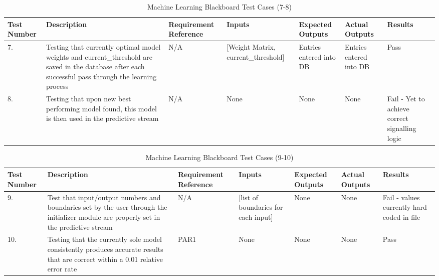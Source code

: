 \documentclass[12pt, titlepage]{article}
\begin{document}
\begin{center}
    \begin{table}[H]
        \centering
        \begin{tabular}{|p{1cm}|p{2.2cm}|p{2.5cm}|p{2.7cm}|p{2.4cm}|p{2.4cm}|p{1.3cm}|}
        \hline
        \bf Test Number & \bf Description & \bf Requirement Reference & \bf Inputs & \bf Expected Outputs & \bf Actual Outputs & \bf Results \\
        \hline
        7. & Testing that currently optimal model weights and current\_threshold are saved in the database after each successful pass through the learning process & N/A & [Weight Matrix, current\_threshold] & Entries entered into DB & Entries entered into DB & Pass\\
        \hline
        8. & Testing that upon new best performing model found, this model is then used in the predictive stream & N/A & None & None & None & Fail - Yet to achieve correct signalling logic\\
        \hline
        \end{tabular}
        \caption{Machine Learning Blackboard Test Cases (7-8)}
        \label{tab:my_label18}
    \end{table}
\end{center}


\begin{center}
    \begin{table}[H]
        \centering
        \begin{tabular}{|p{1cm}|p{2.2cm}|p{2.5cm}|p{2.7cm}|p{2.4cm}|p{2.4cm}|p{1.3cm}|}
        \hline
        \bf Test Number & \bf Description & \bf Requirement Reference & \bf Inputs & \bf Expected Outputs & \bf Actual Outputs & \bf Results \\
        \hline
        9. & Test that input/output numbers and boundaries set by the user through the initializer module are properly set in the predictive stream & N/A & [list of boundaries for each input] & None & None & Fail - values currently hard coded in file\\
        \hline
        10. & Testing that the currently sole model consistently produces accurate results that are correct within a 0.01 relative error rate & PAR1 & None & None & None & Pass\\
        \hline
        \end{tabular}
        \caption{Machine Learning Blackboard Test Cases (9-10)}
        \label{tab:my_label19}
    \end{table}
\end{center}
\end{document}
